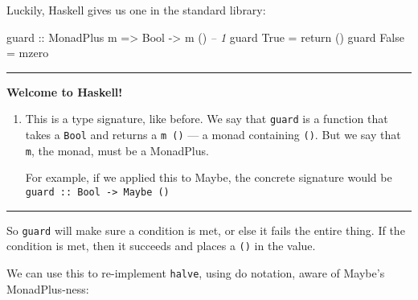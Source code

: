 \documentclass[]{article}
\newenvironment{Shaded}{}{}
\newcommand{\KeywordTok}[1]{\textcolor[rgb]{0.00,0.44,0.13}{\textbf{#1}}}
\newcommand{\DataTypeTok}[1]{\textcolor[rgb]{0.56,0.13,0.00}{#1}}
\newcommand{\DecValTok}[1]{\textcolor[rgb]{0.25,0.63,0.44}{#1}}
\newcommand{\CommentTok}[1]{\textcolor[rgb]{0.38,0.63,0.69}{\textit{#1}}}
\newcommand{\OtherTok}[1]{\textcolor[rgb]{0.00,0.44,0.13}{#1}}
\newcommand{\FunctionTok}[1]{\textcolor[rgb]{0.02,0.16,0.49}{#1}}
\newcommand{\NormalTok}[1]{#1}
\begin{document}
Luckily, Haskell gives us one in the standard library:

\begin{Shaded}
\begin{Highlighting}[]
\OtherTok{guard ::} \DataTypeTok{MonadPlus}\NormalTok{ m }\OtherTok{=>} \DataTypeTok{Bool} \OtherTok{->}\NormalTok{ m ()        }\CommentTok{-- 1}
\NormalTok{guard }\DataTypeTok{True}  \FunctionTok{=}\NormalTok{ return ()}
\NormalTok{guard }\DataTypeTok{False} \FunctionTok{=}\NormalTok{ mzero}
\end{Highlighting}
\end{Shaded}

\begin{center}\rule{0.5\linewidth}{\linethickness}\end{center}

\textbf{Welcome to Haskell!}

\begin{enumerate}
\def\labelenumi{\arabic{enumi}.}
\item
  This is a type signature, like before. We say that \texttt{guard} is a
  function that takes a \texttt{Bool} and returns a \texttt{m\ ()} --- a monad
  containing \texttt{()}. But we say that \texttt{m}, the monad, must be a
  MonadPlus.

  For example, if we applied this to Maybe, the concrete signature would be
  \texttt{guard\ ::\ Bool\ -\textgreater{}\ Maybe\ ()}
\end{enumerate}

\begin{center}\rule{0.5\linewidth}{\linethickness}\end{center}

So \texttt{guard} will make sure a condition is met, or else it fails the entire
thing. If the condition is met, then it succeeds and places a \texttt{()} in the
value.

We can use this to re-implement \texttt{halve}, using do notation, aware of
Maybe's MonadPlus-ness:

\begin{Shaded}
\end{Shaded}
\end{document}
